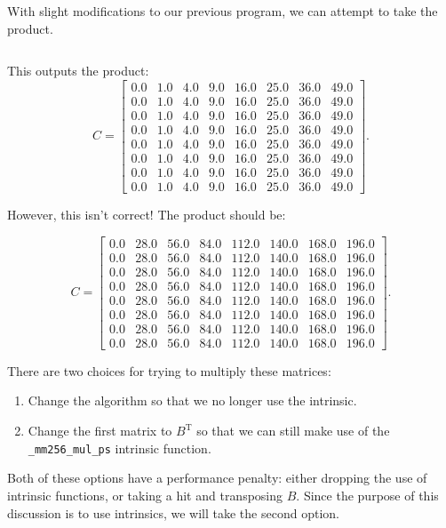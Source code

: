 \documentclass[10pt]{article}
\theoremstyle{definition}
\theoremstyle{plain}
\begin{document}
With slight modifications to our previous program, we can attempt to take the product.
\inputminted[tabsize=2,breaklines,linenos]{c++}{source/mat_mult.cpp}

This outputs the product:
\[
C =
\begin{bmatrix}
    0.0 & 1.0 & 4.0 & 9.0 & 16.0 & 25.0 & 36.0 & 49.0 \\
    0.0 & 1.0 & 4.0 & 9.0 & 16.0 & 25.0 & 36.0 & 49.0 \\
    0.0 & 1.0 & 4.0 & 9.0 & 16.0 & 25.0 & 36.0 & 49.0 \\
    0.0 & 1.0 & 4.0 & 9.0 & 16.0 & 25.0 & 36.0 & 49.0 \\
    0.0 & 1.0 & 4.0 & 9.0 & 16.0 & 25.0 & 36.0 & 49.0 \\
    0.0 & 1.0 & 4.0 & 9.0 & 16.0 & 25.0 & 36.0 & 49.0 \\
    0.0 & 1.0 & 4.0 & 9.0 & 16.0 & 25.0 & 36.0 & 49.0 \\
    0.0 & 1.0 & 4.0 & 9.0 & 16.0 & 25.0 & 36.0 & 49.0
\end{bmatrix}.
\]

However, this isn't correct! The product should be:

\[
C =
\begin{bmatrix}
    0.0 & 28.0 & 56.0 & 84.0 & 112.0 & 140.0 & 168.0 & 196.0 \\
    0.0 & 28.0 & 56.0 & 84.0 & 112.0 & 140.0 & 168.0 & 196.0 \\
    0.0 & 28.0 & 56.0 & 84.0 & 112.0 & 140.0 & 168.0 & 196.0 \\
    0.0 & 28.0 & 56.0 & 84.0 & 112.0 & 140.0 & 168.0 & 196.0 \\
    0.0 & 28.0 & 56.0 & 84.0 & 112.0 & 140.0 & 168.0 & 196.0 \\
    0.0 & 28.0 & 56.0 & 84.0 & 112.0 & 140.0 & 168.0 & 196.0 \\
    0.0 & 28.0 & 56.0 & 84.0 & 112.0 & 140.0 & 168.0 & 196.0 \\
    0.0 & 28.0 & 56.0 & 84.0 & 112.0 & 140.0 & 168.0 & 196.0
\end{bmatrix}.
\]

There are two choices for trying to multiply these matrices:
\begin{enumerate}
  \item Change the algorithm so that we no longer use the intrinsic.
  \item Change the first matrix to $B^\text{T}$ so that we can still make use of the \texttt{\_mm256\_mul\_ps} intrinsic function.
\end{enumerate}
Both of these options have a performance penalty: either dropping the use of intrinsic functions, or taking a hit and transposing $B$. Since the purpose of this discussion is to use intrinsics, we will take the second option.
\end{document}

